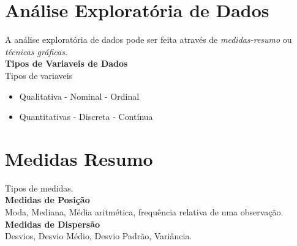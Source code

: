 \documentclass[12pt,a4paper]{article}
\begin{document}
 	
 	\section{Análise Exploratória de Dados}
 	
 	A análise exploratória de dados pode ser feita através de \textit{medidas-resumo} ou \textit{técnicas gráficas}.\\
 	
	\textbf{Tipos de Variaveis de Dados} \\
	
		Tipos de variaveis
		
		\begin{itemize}
			\item Qualitativa
				\subitem - Nominal
				\subitem - Ordinal
			\item Quantitativas
				\subitem - Discreta
				\subitem - Contínua
		\end{itemize}
	
	\vskip 10pt
	
	
	\section{Medidas Resumo}
	
	Tipos de medidas. \\
	
	\textbf{Medidas de Posição}\\
	Moda, Mediana, Média aritmética, frequência relativa de uma observação.\\
	
	\textbf{Medidas de Dispersão} \\
	Desvios, Desvio Médio, Desvio Padrão, Variância.
	
	\
		
		
	
\end{document}
